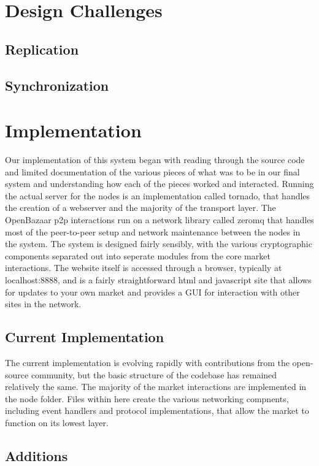 \documentclass[12pt,twocolumn]{article}
\begin{document}
\section{Design Challenges}
\subsection{Replication}
\subsection{Synchronization}



\section{Implementation}
Our implementation of this system began with reading through the source code and limited documentation of the various pieces of what was to be in our final system and understanding how each of the pieces worked and interacted. Running the actual server for the nodes is an implementation called tornado, that handles the creation of a webserver and the majority of the transport layer. The OpenBazaar p2p interactions run on a network library called zeromq that handles most of the peer-to-peer setup and network maintenance between the nodes in the system. The system is designed fairly sensibly, with the various cryptographic components separated out into seperate modules from the core market interactions. The website itself is accessed through a browser, typically at {{\sc localhost:8888}}, and is a fairly straightforward html and javascript site that allows for updates to your own market and provides a GUI for interaction with other sites in the network.

\subsection{Current Implementation}
The current implementation is evolving rapidly with contributions from the open-source community, but the basic structure of the codebase has remained relatively the same. The majority of the market interactions are implemented in the node folder. Files within here create the various networking compnents, including event handlers and protocol implementations, that allow the market to function on its lowest layer. 

\subsection{Additions}
\end{document}
